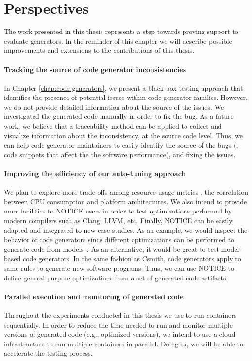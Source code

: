 \section{Perspectives}
The work presented in this thesis represents a step towards proving support to evaluate generators. In the reminder of this chapter we will describe possible improvements and extensions to the contributions of this thesis.

\paragraph{Tracking the source of code generator inconsistencies} 
In Chapter \ref{chap:code generators}, we present a black-box testing approach that identifies the presence of potential issues within code generator families. However, we do not provide detailed information about the source of the issues. We investigated the generated code manually in order to fix the bug. As a future work, we believe that a traceability method can be applied to collect and visualize information about the inconsistency, at the source code level. Thus, we can help code generator maintainers to easily identify the source of the bugs (\eg, code snippets that affect the the software performance), and fixing the issues.

\paragraph{Improving the efficiency of our auto-tuning approach}
We plan to explore more trade-offs among resource usage metrics \eg, the correlation between CPU consumption and platform architectures. 
We also intend to provide more facilities to NOTICE users in order to test optimizations performed by modern compilers such as Clang, LLVM, etc.
Finally, NOTICE can be easily adapted and integrated to new case studies. As an example, we would inspect the behavior of code generators since different optimizations can be performed to generate code from models~\cite{stuermer2007systematic}. As an alternative, it would be great to test model-based code generators. In the same fashion as Csmith, code generators apply to same rules to generate new software programs. Thus, we can use NOTICE to define general-purpose optimizations from a set of generated code artifacts. 

\paragraph{Parallel execution and monitoring of generated code}
Throughout the experiments conducted in this thesis we use to run containers sequentially. In order to reduce the time needed to run and monitor multiple versions of generated code (e.g., optimized versions), we intend to use a cloud infrastructure to run multiple containers in parallel. Doing so, we will be able to accelerate the testing process.


